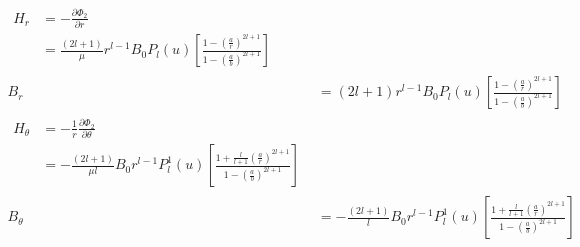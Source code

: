 \begin{align}
    \begin{split}\label{Hr}
        H_r &=-\frac{\partial \Phi_2}{\partial r}\\
        &=\frac{(2l+1)}{\mu}r^{l-1}B_0P_l(u)\left[\frac{1-\left(\frac{a}{r}\right)^{2l+1}}{1-\left(\frac{a}{b}\right)^{2l+1}}\right]
    \end{split}\\
    B_r &=(2l+1)r^{l-1}B_0P_l(u)\left[\frac{1-\left(\frac{a}{r}\right)^{2l+1}}{1-\left(\frac{a}{b}\right)^{2l+1}}\right]\label{Br}\\
    \begin{split}\label{Ht}
        H_\theta &=-\frac{1}{r}\frac{\partial \Phi_2}{\partial \theta}\\
         & =-\frac{(2l+1)}{\mu l}B_0r^{l-1}P_l^1(u)\left[
         \frac{1+\frac{l}{l+1}\left(\frac{a}{r}\right)^{2l+1}}
         {1-\left(\frac{a}{b}\right)^{2l+1}}
         \right]
    \end{split}\\
    B_\theta &=-\frac{(2l+1)}{l}B_0r^{l-1}P_l^1(u)\left[\frac{1+\frac{l}{l+1}\left(\frac{a}{r}\right)^{2l+1}}{1-\left(\frac{a}{b}\right)^{2l+1}}\right]\label{Bt}
\end{align}




